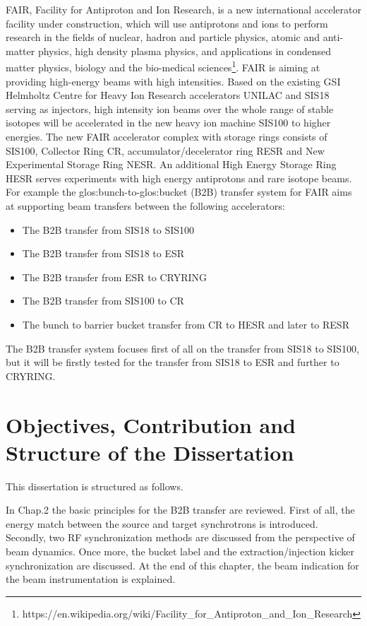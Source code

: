 FAIR, Facility for Antiproton and Ion Research, is a new international accelerator facility under construction, which will use antiprotons and ions to perform research in the fields of nuclear, hadron and particle physics, atomic and anti-matter physics, high density plasma physics, and applications in condensed matter physics, biology and the bio-medical sciences\footnote{https://en.wikipedia.org/wiki/Facility_for_Antiproton_and_Ion_Research}. FAIR is aiming at providing high-energy beams with high intensities. Based on the existing GSI Helmholtz Centre for Heavy Ion Research accelerators UNILAC and SIS18 serving as injectors, high intensity ion beams over the whole range of stable isotopes will be accelerated in the new heavy ion machine SIS100 to higher energies. The new FAIR accelerator complex with storage rings consists of SIS100, Collector Ring CR, accumulator/decelerator ring RESR and New Experimental Storage Ring NESR. An additional High Energy Storage Ring HESR serves experiments with high energy antiprotons and rare isotope beams.  
For example the \gls{glos:bunch}-to-\gls{glos:bucket} (\gls{B2B}) transfer system for FAIR aims at supporting beam transfers between the following accelerators:
\begin{itemize}
\item The B2B transfer from SIS18 to SIS100
\item The B2B transfer from SIS18 to ESR
\item The B2B transfer from ESR to CRYRING
\item The B2B transfer from SIS100 to CR
\item The bunch to barrier bucket transfer from CR to HESR and later to RESR
\end{itemize}

The B2B transfer system focuses first of all on the transfer from SIS18 to SIS100, but it will be firstly tested for the transfer from SIS18 to ESR and further to CRYRING.

\section{Objectives, Contribution and Structure of the Dissertation}
This dissertation is structured as follows.

In Chap.2 the basic principles for the B2B transfer are reviewed. First of all, the energy match between the source and target synchrotrons is introduced. Secondly, two RF synchronization methods are discussed from the perspective of beam dynamics. Once more, the bucket label and the extraction/injection kicker synchronization are discussed. At the end of this chapter, the beam indication for the beam instrumentation is explained.

